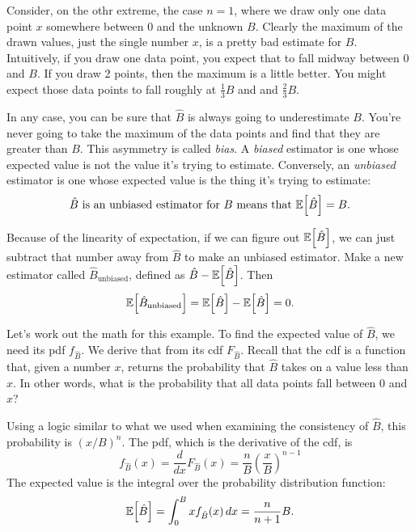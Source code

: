 Consider, on the othr extreme, the case $n=1$, where we draw only one data
point $x$ somewhere between 0 and the unknown $B$. Clearly the maximum of the
drawn values, just the single number $x$, is a pretty bad estimate for $B$.
Intuitively, if you draw one data point, you expect that to fall midway
between 0 and $B$. If you draw 2 points, then the maximum is a little better.
You might expect those data points to fall roughly at $\tfrac{1}{3} B$ and
and $\tfrac{2}{3} B$.

In any case, you can be sure that $\hat{B}$ is always going to underestimate
$B$. You're never going to take the maximum of the data points and find that
they are greater than $B$. This asymmetry is called \emph{bias}. A
\emph{biased} estimator is one whose expected value is not the value it's
trying to estimate. Conversely, an \emph{unbiased} estimator is one whose
expected value is the thing it's trying to estimate:
\begin{equation}
\text{$\hat{B}$ is an unbiased estimator for $B$ means that } \mathbb{E}\!\left[{\hat{B}}\right] = B.
\end{equation}

Because of the linearity of expectation, if we can figure out $\mathbb{E}\!\left[{\hat{B}}\right]$, we can
just subtract that number away from $\hat{B}$ to make an unbiased estimator. Make a new
estimator called $\hat{B}_\mathrm{unbiased}$, defined as $\hat{B} - \mathbb{E}\!\left[{\hat{B}}\right]$. Then
\begin{equation*}
    \mathbb{E}\!\left[{\hat{B}_\mathrm{unbiased}}\right] = \mathbb{E}\!\left[{\hat{B}}\right] - \mathbb{E}\!\left[{\hat{B}}\right] = 0.
\end{equation*}

Let's work out the math for this example. To find the expected value of
$\hat{B}$, we need its pdf $f_{\hat{B}}$. We derive that from its cdf $F_{\hat{B}}$. Recall that the cdf
is a function that, given a number $x$, returns the probability that $\hat{B}$
takes on a value less than $x$. In other words, what is the probability that
all data points fall between 0 and $x$?

Using a logic similar to what we used when examining the consistency of $\hat{B}$,
this probability is $(x / B)^n$. The pdf, which is the derivative of the cdf,
is
\begin{equation*}
    f_{\hat{B}}(x) = \frac{d}{dx} F_{\hat{B}}(x) = \frac{n}{B} \left( \frac{x}{B} \right)^{n-1}
\end{equation*}
The expected value is the integral over the probability distribution function:
\begin{equation}
    \mathbb{E}\!\left[{\hat{B}}\right] = \int_0^B x f_{\hat{B}}(x) \,dx = \frac{n}{n+1} B.
\end{equation}

